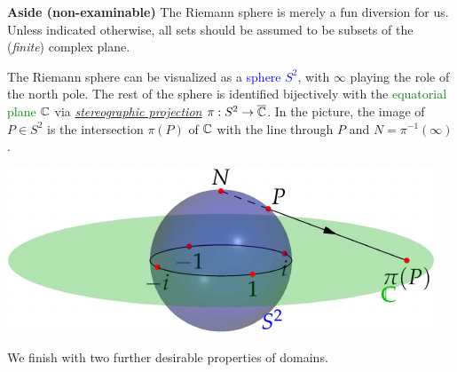 \begin{aside}{\bf Aside (non-examinable)}{}
	The Riemann sphere is merely a fun diversion for us. Unless indicated otherwise, all sets should be assumed to be subsets of the (\emph{finite}) complex plane.\par
	\begin{minipage}[t]{0.54\linewidth}\vspace{-5pt}
		The Riemann sphere can be visualized as a \textcolor{blue}{sphere $S^2$}, with $\infty$ playing the role of the north pole. The rest of the sphere is identified bijectively with the \textcolor{Green}{equatorial plane $\mathbb{C}$} via \href{https://en.wikipedia.org/wiki/Stereographic_projection}{\emph{stereographic projection}} $\pi:S^2\to\overline{\mathbb{C}}$. In the picture, the image of $P\in S^2$ is the intersection $\pi(P)$ of $\mathbb{C}$ with the line through $P$ and $N=\pi^{-1}(\infty)$.
	\end{minipage}
	\hfill
	\begin{minipage}[t]{0.45\linewidth}\vspace{-4pt}
		\flushright%
		\href{https://www.math.uci.edu/~ndonalds/math147/complex-stereo.html}{\includegraphics[scale=0.9]{complex-stereo}}
	\end{minipage}
\end{aside}

 

We finish with two further desirable properties of domains.

